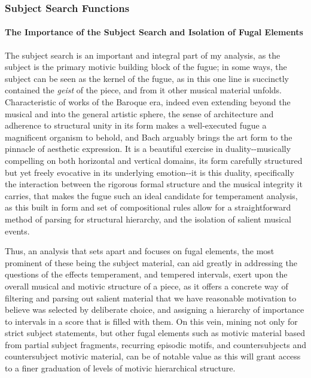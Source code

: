 \subsubsection{Subject Search Functions}\label{subject-search-functions}

\paragraph{The Importance of the Subject Search and Isolation of Fugal
Elements}\label{the-importance-of-the-subject-search-and-isolation-of-fugal-elements}

The subject search is an important and integral part of my analysis, as
the subject is the primary motivic building block of the fugue; in some
ways, the subject can be seen as the kernel of the fugue, as in this one
line is succinctly contained the \emph{geist} of the piece, and from it
other musical material unfolds. Characteristic of works of the Baroque
era, indeed even extending beyond the musical and into the general
artistic sphere, the sense of architecture and adherence to structural
unity in its form makes a well-executed fugue a magnificent organism to
behold, and Bach arguably brings the art form to the pinnacle of
aesthetic expression. It is a beautiful exercise in duality-\/-musically
compelling on both horizontal and vertical domains, its form carefully
structured but yet freely evocative in its underlying emotion-\/-it is
this duality, specifically the interaction between the rigorous formal
structure and the musical integrity it carries, that makes the fugue
such an ideal candidate for temperament analysis, as this built in form
and set of compositional rules allow for a straightforward method of
parsing for structural hierarchy, and the isolation of salient musical
events.

Thus, an analysis that sets apart and focuses on fugal elements, the
most prominent of these being the subject material, can aid greatly in
addressing the questions of the effects temperament, and tempered
intervals, exert upon the overall musical and motivic structure of a
piece, as it offers a concrete way of filtering and parsing out salient
material that we have reasonable motivation to believe was selected by
deliberate choice, and assigning a hierarchy of importance to intervals
in a score that is filled with them. On this vein, mining not only for
strict subject statements, but other fugal elements such as motivic
material based from partial subject fragments, recurring episodic
motifs, and countersubjects and countersubject motivic material, can be
of notable value as this will grant access to a finer graduation of
levels of motivic hierarchical structure.

